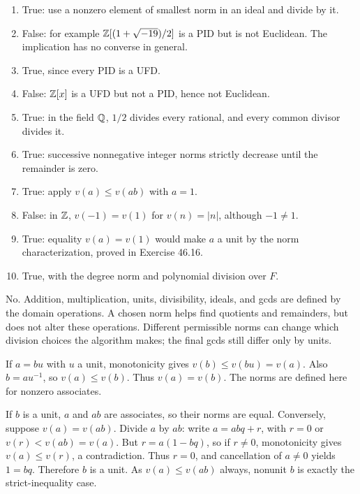 \begin{enumerate}[label=(\alph*)]
\item True: use a nonzero element of smallest norm in an ideal and divide by it.
\item False: for example $\mathbb{Z}[(1+\sqrt{-19})/2]$ is a PID but is not Euclidean. The implication has no converse in general.
\item True, since every PID is a UFD.
\item False: $\mathbb{Z}[x]$ is a UFD but not a PID, hence not Euclidean.
\item True: in the field $\mathbb{Q}$, $1/2$ divides every rational, and every common divisor divides it.
\item True: successive nonnegative integer norms strictly decrease until the remainder is zero.
\item True: apply $v(a)\le v(ab)$ with $a=1$.
\item False: in $\mathbb{Z}$, $v(-1)=v(1)$ for $v(n)=|n|$, although $-1\ne1$.
\item True: equality $v(a)=v(1)$ would make $a$ a unit by the norm characterization, proved in Exercise 46.16.
\item True, with the degree norm and polynomial division over $F$.
\end{enumerate}

No. Addition, multiplication, units, divisibility, ideals, and gcds are defined by the domain operations. A chosen norm helps find quotients and remainders, but does not alter these operations. Different permissible norms can change which division choices the algorithm makes; the final gcds still differ only by units.

If $a=bu$ with $u$ a unit, monotonicity gives $v(b)\le v(bu)=v(a)$. Also $b=au^{-1}$, so $v(a)\le v(b)$. Thus $v(a)=v(b)$. The norms are defined here for nonzero associates.

If $b$ is a unit, $a$ and $ab$ are associates, so their norms are equal. Conversely, suppose $v(a)=v(ab)$. Divide $a$ by $ab$: write $a=abq+r$, with $r=0$ or $v(r)<v(ab)=v(a)$. But $r=a(1-bq)$, so if $r\ne0$, monotonicity gives $v(a)\le v(r)$, a contradiction. Thus $r=0$, and cancellation of $a\ne0$ yields $1=bq$. Therefore $b$ is a unit. As $v(a)\le v(ab)$ always, nonunit $b$ is exactly the strict-inequality case.

